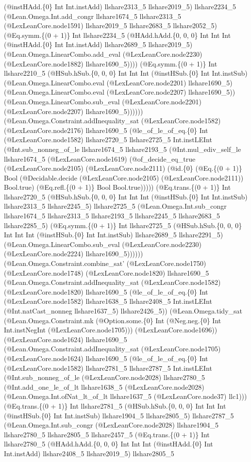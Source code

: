 \documentclass[11pt]{article}
\begin{document}
(@instHAdd.\{0\} Int Int.instAdd) llshare2313\_5 llshare2019\_5) llshare2234\_5 (@Lean.Omega.Int.add\_congr llshare1674\_5 llshare2313\_5 (@LexLeanCore.node1591) llshare2019\_5 llshare2683\_5 llshare2052\_5) (@Eq.symm.\{(0 + 1)\} Int llshare2234\_5 (@HAdd.hAdd.\{0, 0, 0\} Int Int Int (@instHAdd.\{0\} Int Int.instAdd) llshare2689\_5 llshare2019\_5) (@Lean.Omega.LinearCombo.add\_eval (@LexLeanCore.node2230) (@LexLeanCore.node1882) llshare1690\_5)))) (@Eq.symm.\{(0 + 1)\} Int llshare2210\_5 (@HSub.hSub.\{0, 0, 0\} Int Int Int (@instHSub.\{0\} Int Int.instSub) (@Lean.Omega.LinearCombo.eval (@LexLeanCore.node2201) llshare1690\_5) (@Lean.Omega.LinearCombo.eval (@LexLeanCore.node2207) llshare1690\_5)) (@Lean.Omega.LinearCombo.sub\_eval (@LexLeanCore.node2201) (@LexLeanCore.node2207) llshare1690\_5)))))) (@Lean.Omega.Constraint.addInequality\_sat (@LexLeanCore.node1582) (@LexLeanCore.node2176) llshare1690\_5 (@le\_of\_le\_of\_eq.\{0\} Int (@LexLeanCore.node1582) llshare2720\_5 llshare2725\_5 Int.instLEInt (@Int.sub\_nonneg\_of\_le llshare1674\_5 llshare2193\_5 (@Int.mul\_ediv\_self\_le llshare1674\_5 (@LexLeanCore.node1619) (@of\_decide\_eq\_true (@LexLeanCore.node2105) (@LexLeanCore.node2111) (@id.\{0\} (@Eq.\{(0 + 1)\} Bool (@Decidable.decide (@LexLeanCore.node2105) (@LexLeanCore.node2111)) Bool.true) (@Eq.refl.\{(0 + 1)\} Bool Bool.true))))) (@Eq.trans.\{(0 + 1)\} Int llshare2720\_5 (@HSub.hSub.\{0, 0, 0\} Int Int Int (@instHSub.\{0\} Int Int.instSub) llshare2313\_5 llshare2245\_5) llshare2725\_5 (@Lean.Omega.Int.sub\_congr llshare1674\_5 llshare2313\_5 llshare2193\_5 llshare2245\_5 llshare2683\_5 llshare2285\_5) (@Eq.symm.\{(0 + 1)\} Int llshare2725\_5 (@HSub.hSub.\{0, 0, 0\} Int Int Int (@instHSub.\{0\} Int Int.instSub) llshare2689\_5 llshare2291\_5) (@Lean.Omega.LinearCombo.sub\_eval (@LexLeanCore.node2230) (@LexLeanCore.node2224) llshare1690\_5)))))) (@Lean.Omega.Constraint.combine\_sat' (@LexLeanCore.node1750) (@LexLeanCore.node1748) (@LexLeanCore.node1820) llshare1690\_5 (@Lean.Omega.Constraint.addInequality\_sat (@LexLeanCore.node1582) (@LexLeanCore.node1820) llshare1690\_5 (@le\_of\_le\_of\_eq.\{0\} Int (@LexLeanCore.node1582) llshare1638\_5 llshare2408\_5 Int.instLEInt (@Int.natCast\_nonneg llshare1637\_5) llshare2426\_5)) (@Lean.Omega.tidy\_sat (@Lean.Omega.Constraint.mk (@Option.some.\{0\} Int (@Neg.neg.\{0\} Int Int.instNegInt (@LexLeanCore.node1705))) (@LexLeanCore.node1696)) (@LexLeanCore.node1624) llshare1690\_5 (@Lean.Omega.Constraint.addInequality\_sat (@LexLeanCore.node1705) (@LexLeanCore.node1624) llshare1690\_5 (@le\_of\_le\_of\_eq.\{0\} Int (@LexLeanCore.node1582) llshare2781\_5 llshare2787\_5 Int.instLEInt (@Int.sub\_nonneg\_of\_le (@LexLeanCore.node2028) llshare2780\_5 (@Int.add\_one\_le\_of\_lt llshare1638\_5 (@LexLeanCore.node2028) (@Lean.Omega.Int.ofNat\_lt\_of\_lt llshare1637\_5 (@LexLeanCore.node37) llc1))) (@Eq.trans.\{(0 + 1)\} Int llshare2781\_5 (@HSub.hSub.\{0, 0, 0\} Int Int Int (@instHSub.\{0\} Int Int.instSub) llshare1904\_5 llshare2805\_5) llshare2787\_5 (@Lean.Omega.Int.sub\_congr (@LexLeanCore.node2028) llshare1904\_5 llshare2780\_5 llshare2805\_5 llshare2457\_5 (@Eq.trans.\{(0 + 1)\} Int llshare2780\_5 (@HAdd.hAdd.\{0, 0, 0\} Int Int Int (@instHAdd.\{0\} Int Int.instAdd) llshare2408\_5 llshare2019\_5) llshare2805\_5 
\end{document}
